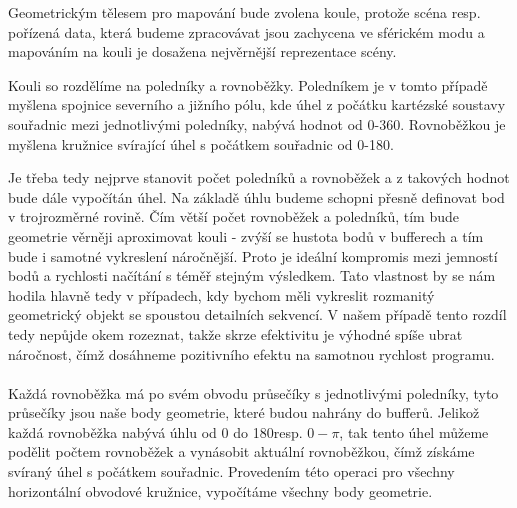 Geometrickým tělesem pro mapování bude zvolena koule, protože scéna resp. pořízená data, která budeme zpracovávat jsou zachycena ve sférickém modu a mapováním na kouli je dosažena nejvěrnější reprezentace scény.

Kouli so rozdělíme na poledníky a rovnoběžky. Poledníkem je v tomto případě myšlena spojnice severního a jižního pólu, kde úhel z počátku kartézské soustavy souřadnic mezi jednotlivými poledníky, nabývá hodnot od 0-360\degree. Rovnoběžkou je myšlena kružnice svírající úhel s počátkem souřadnic od 0-180\degree. 

Je třeba tedy nejprve stanovit počet poledníků a rovnoběžek a z takových hodnot bude dále vypočítán úhel. Na základě úhlu budeme schopni přesně definovat bod v trojrozměrné rovině. Čím větší počet rovnoběžek a poledníků, tím bude geometrie věrněji aproximovat kouli - zvýší se hustota bodů v bufferech a tím bude i samotné vykreslení náročnější. Proto je ideální kompromis mezi jemností bodů a rychlosti načítání s téměř stejným výsledkem. Tato vlastnost by se nám hodila hlavně tedy v případech, kdy bychom měli vykreslit rozmanitý geometrický objekt se spoustou detailních sekvencí. V našem případě tento rozdíl tedy nepůjde okem rozeznat, takže skrze efektivitu je výhodné spíše ubrat náročnost, čímž dosáhneme pozitivního efektu na samotnou rychlost programu.
\\\\

Každá rovnoběžka má po svém obvodu průsečíky s jednotlivými poledníky, tyto průsečíky jsou naše body geometrie, které budou nahrány do bufferů. Jelikož každá rovnoběžka nabývá úhlu od 0 do 180\degree  resp. $0-\pi$, tak tento úhel můžeme podělit počtem rovnoběžek a vynásobit aktuální rovnoběžkou, čímž získáme svíraný úhel s počátkem souřadnic. Provedením této operaci pro všechny horizontální obvodové kružnice, vypočítáme všechny body geometrie.

